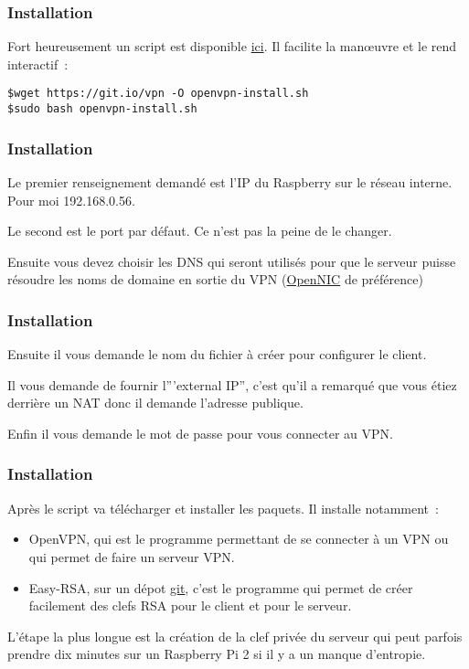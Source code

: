 \begin{frame}[containsverbatim]
\frametitle{Installation}

Fort heureusement un script est disponible \href{https://github.com/Nyr/openvpn-install}{ici}. Il facilite la manœuvre et le rend interactif~:

\begin{verbatim}
$wget https://git.io/vpn -O openvpn-install.sh 
$sudo bash openvpn-install.sh
\end{verbatim}

\end{frame}

\begin{frame}[containsverbatim]
\frametitle{Installation}

Le premier renseignement demandé est l'IP du Raspberry sur le réseau interne. Pour moi 192.168.0.56.

Le second est le port par défaut. Ce n'est pas la peine de le changer.

Ensuite vous devez choisir les DNS qui seront utilisés pour que le serveur puisse résoudre les noms de domaine en sortie du VPN (\href{https://www.opennicproject.org/}{OpenNIC} de préférence)

\end{frame}

\begin{frame}[containsverbatim]
\frametitle{Installation}

Ensuite il vous demande le nom du fichier à créer pour configurer le client.

Il vous demande de fournir l'''external IP'', c'est qu'il a remarqué que vous étiez derrière un NAT donc il demande l'adresse publique. 

Enfin il vous demande le mot de passe pour vous connecter au VPN. 

\end{frame}

\begin{frame}[containsverbatim]
\frametitle{Installation}

Après le script va télécharger et installer les paquets. Il installe notamment~:
\begin{itemize}
	\item OpenVPN, qui est le programme permettant de se connecter à un VPN ou qui permet de faire un serveur VPN.
	\item Easy-RSA, sur un dépot \href{https://github.com/OpenVPN/easy-rsa}{git}, c'est le programme qui permet de créer facilement des clefs RSA pour le client et pour le serveur. 
\end{itemize}

L'étape la plus longue est la création de la clef privée du serveur qui peut parfois prendre dix minutes sur un Raspberry Pi 2 si il y a un manque d'entropie.

\end{frame}

